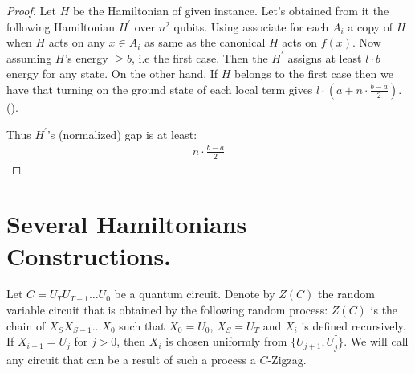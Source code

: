 \documentclass[manuscript,screen,review]{acmart}
\begin{document}
\begin{proof}
  Let $H$ be the Hamiltonian of given \CLASS instance. Let's obtained from it the following Hamiltonian $H^{\prime}$ over $n^{2}$ qubits. Using  associate for each $A_{i}$ a copy of $H$ when $H$ acts on any $x \in A_{i}$ as same as the canonical $H$ acts on $f(x)$. Now assuming $H$'s energy $\ge b$, i.e the first case. Then the $H^{\prime}$ assigns at least $l \cdot b $ energy for any state. On the other hand, If $H$ belongs to the first case then we have that turning on the ground state of each local term gives $l \cdot (a + n \cdot \frac{b-a}{2} )$. ().

  Thus $H^{\prime}$'s (normalized) gap is at least: 
  \begin{equation*}
    \begin{split}
      n \cdot \frac{b-a}{2}
    \end{split}
  \end{equation*}
\end{proof}


\section{Several Hamiltonians Constructions.}

\begin{definition} 
Let $C = U_{T}U_{T-1} \dots U_{0}$ be a quantum circuit. Denote by $Z(C)$ the random variable circuit that is obtained by the following random process: $Z(C)$ is the chain of $X_{S}X_{S-1} \dots X_{0}$ such that $X_{0}=U_{0}$, $X_{S}=U_{T}$ and $X_{i}$ is defined recursively. If $X_{i-1} = U_{j}$ for $j>0$, then $X_{i}$ is chosen uniformly from  $\{ U_{j+1}, U_{j}^{\dagger} \}$. We will call any circuit that can be a result of such a process a $C$-Zigzag.
\end{definition}
\end{document}
